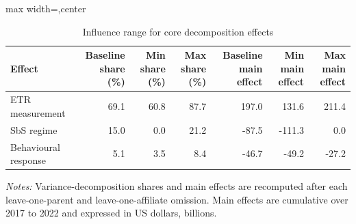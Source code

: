 \begin{table}[H]
\centering
\scriptsize
\caption{Influence range for core decomposition effects}
\label{tab:app_jurisdiction_influence_decomposition}
\begin{adjustbox}{max width=\textwidth,center}
\begin{tabular}{@{}lrrrrrr@{}}
\toprule
Effect & Baseline share (\%) & Min share (\%) & Max share (\%) & Baseline main effect & Min main effect & Max main effect \\
\midrule
ETR measurement & 69.1 & 60.8 & 87.7 & 197.0 &  131.6 & 211.4 \\
SbS regime & 15.0 &  0.0 & 21.2 & -87.5 & -111.3 &   0.0 \\
Behavioural response &  5.1 &  3.5 &  8.4 & -46.7 &  -49.2 & -27.2 \\
\bottomrule
\end{tabular}
\end{adjustbox}

\vspace{0.5em}
\begin{minipage}{0.96\textwidth}
\footnotesize\raggedright \textit{Notes:} Variance-decomposition shares and main effects are recomputed after each leave-one-parent and leave-one-affiliate omission. Main effects are cumulative over 2017 to 2022 and expressed in US dollars, billions.
\end{minipage}
\end{table}
